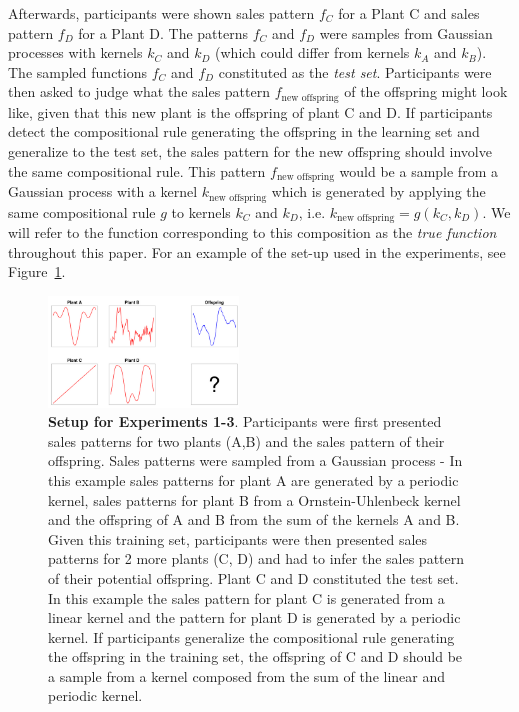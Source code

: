 \documentclass[10pt,letterpaper]{article}
\begin{document}
Afterwards, participants were shown sales pattern $f_C$ for a Plant C and sales pattern $f_D$ for a Plant D. The patterns $f_C$ and $f_D$ were samples from Gaussian processes with kernels $k_C$ and $k_D$ (which could differ from kernels $k_A$ and $k_B$). The sampled functions $f_C$ and $f_D$ constituted as the \emph{test set}. Participants were then asked to judge what the sales pattern $f_{\text{new offspring}}$ of the offspring might look like, given that this new plant is the offspring of plant C and D. If participants detect the compositional rule generating the offspring in the learning set and generalize to the test set, the sales pattern for the new offspring should involve the same compositional rule. This pattern $f_{\text{new offspring}}$ would be a sample from a Gaussian process with a kernel $k_{\text{new offspring}}$ which is generated by applying the same compositional rule $g$ to kernels $k_C$ and $k_D$, i.e. $k_{\text{new offspring}} = g(k_C,k_D)$. We will refer to the function corresponding to this composition as the \textit{true function} throughout this paper. 
For an example of the set-up used in the experiments, see Figure~\ref{fig:setupEx}.


\begin{figure}[ht!]
\centering
\includegraphics[width=0.45\textwidth]{screenshot1.png}
\caption{\textbf{Setup for Experiments 1-3}.
Participants were first presented sales patterns for two plants (A,B) and the sales pattern of their offspring. Sales patterns were sampled from a Gaussian process - In this example sales patterns for plant A are generated by a periodic kernel, sales patterns for plant B from a Ornstein-Uhlenbeck kernel and the offspring of A and B from the sum of the kernels A and B. Given this training set, participants were then presented sales patterns for 2 more plants (C, D) and had to infer the sales pattern of their potential offspring. Plant C and D constituted the test set. In this example the sales pattern for plant C is generated from a linear kernel and the pattern for plant D is generated by a periodic kernel. If participants generalize the compositional rule generating the offspring in the training set, the offspring of C and D should be a sample from a kernel composed from the sum of the linear and periodic kernel.}
\label{fig:setupEx}
\end{figure}
\end{document}

